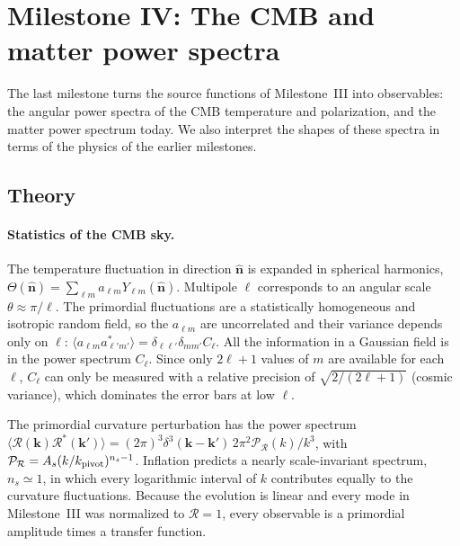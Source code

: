 \section{Milestone IV: The CMB and matter power spectra}\label{sec:m4}

The last milestone turns the source functions of Milestone~III into observables: the angular power spectra of the
CMB temperature and polarization, and the matter power spectrum today. We also interpret the shapes of these spectra
in terms of the physics of the earlier milestones.

\subsection{Theory}

\paragraph*{Statistics of the CMB sky.} The temperature fluctuation in direction $\hat{\bm n}$ is expanded in
spherical harmonics, $\Theta(\hat{\bm n})=\sum_{\ell m}a_{\ell m}Y_{\ell m}(\hat{\bm n})$. Multipole $\ell$ corresponds
to an angular scale $\theta\approx\pi/\ell$. The primordial fluctuations are a statistically homogeneous and
isotropic random field, so the $a_{\ell m}$ are uncorrelated and their variance depends only on $\ell$:
$\langle a_{\ell m}a^*_{\ell'm'}\rangle=\delta_{\ell\ell'}\delta_{mm'}C_\ell$. All the information in a Gaussian field is
in the power spectrum $C_\ell$. Since only $2\ell+1$ values of $m$ are available for each $\ell$, $C_\ell$ can only be
measured with a relative precision of $\sqrt{2/(2\ell+1)}$ (cosmic variance), which dominates the error bars at
low $\ell$.

The primordial curvature perturbation has the power spectrum
$\langle\mathcal{R}(\bm k)\mathcal{R}^*(\bm k')\rangle=(2\pi)^3\delta^3(\bm k-\bm k')\,2\pi^2\mathcal{P}_{\mathcal{R}}(k)/k^3$,
with $\mathcal{P}_{\mathcal{R}}=A_s(k/k_{\rm pivot})^{n_s-1}$. Inflation predicts a nearly scale-invariant spectrum,
$n_s\simeq1$, in which every logarithmic interval of $k$ contributes equally to the curvature fluctuations. Because the
evolution is linear and every mode in Milestone~III was normalized to $\mathcal{R}=1$, every observable is a
primordial amplitude times a transfer function.

